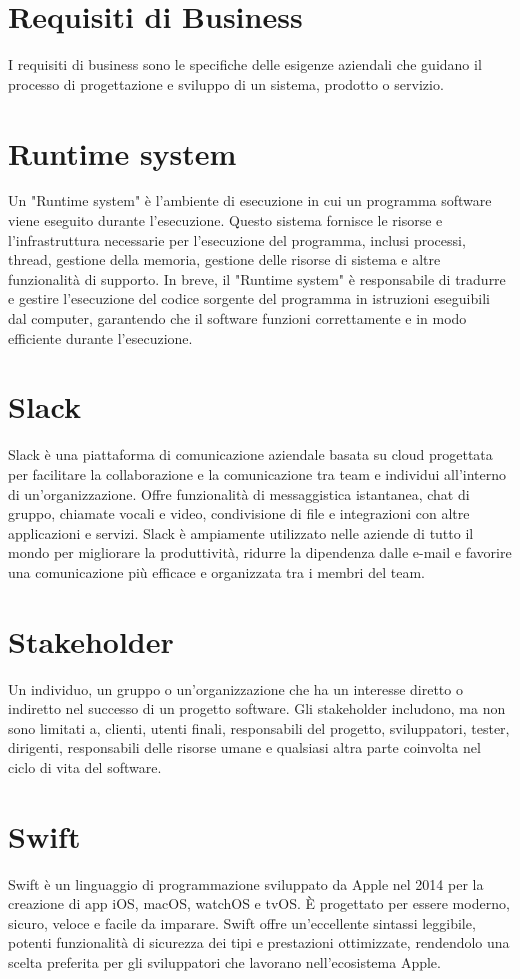 \documentclass{article}
\begin{document}
\section{Requisiti di Business}
I  requisiti di business sono le specifiche delle esigenze aziendali che guidano il processo di progettazione e sviluppo di un sistema, prodotto o servizio.

\section{Runtime system}
Un "Runtime system" è l'ambiente di esecuzione in cui un programma software viene eseguito durante l'esecuzione. Questo sistema fornisce le risorse e l'infrastruttura necessarie per l'esecuzione del programma, inclusi processi, thread, gestione della memoria, gestione delle risorse di sistema e altre funzionalità di supporto. In breve, il "Runtime system" è responsabile di tradurre e gestire l'esecuzione del codice sorgente del programma in istruzioni eseguibili dal computer, garantendo che il software funzioni correttamente e in modo efficiente durante l'esecuzione.

\section{Slack}
Slack è una piattaforma di comunicazione aziendale basata su cloud progettata per facilitare la collaborazione e la comunicazione tra team e individui all'interno di un'organizzazione. Offre funzionalità di messaggistica istantanea, chat di gruppo, chiamate vocali e video, condivisione di file e integrazioni con altre applicazioni e servizi. Slack è ampiamente utilizzato nelle aziende di tutto il mondo per migliorare la produttività, ridurre la dipendenza dalle e-mail e favorire una comunicazione più efficace e organizzata tra i membri del team.

\section{Stakeholder}
Un individuo, un gruppo o un'organizzazione che ha un interesse diretto o indiretto nel successo di un progetto software. Gli stakeholder includono, ma non sono limitati a, clienti, utenti finali, responsabili del progetto, sviluppatori, tester, dirigenti, responsabili delle risorse umane e qualsiasi altra parte coinvolta nel ciclo di vita del software.

\section{Swift}
Swift è un linguaggio di programmazione sviluppato da Apple nel 2014 per la creazione di app iOS, macOS, watchOS e tvOS. È progettato per essere moderno, sicuro, veloce e facile da imparare. Swift offre un'eccellente sintassi leggibile, potenti funzionalità di sicurezza dei tipi e prestazioni ottimizzate, rendendolo una scelta preferita per gli sviluppatori che lavorano nell'ecosistema Apple.
\end{document}
